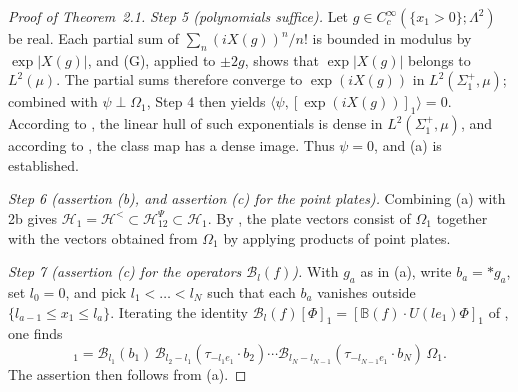 \documentclass[11pt,letterpaper,reqno]{amsart}
\theoremstyle{definition}
\begin{document}
\begin{proof}[Proof of Theorem~2.1]
\emph{Step 5 (polynomials suffice).}
Let $g\in C_c^\infty(\{x_1>0\};\Lambda^2)$ be real.
Each partial sum of $\sum_n(iX(g))^n/n!$ is bounded in modulus by $\exp|X(g)|$, and (G), applied to $\pm2g$, shows that $\exp|X(g)|$ belongs to $L^2(\mu)$.
The partial sums therefore converge to $\exp(iX(g))$ in $L^2(\Sigma_1^+,\mu)$; combined with $\psi\perp\Omega_1$, Step 4 then yields $\langle\psi,[\exp(iX(g))]_1\rangle=0$.
According to \cite[Lemma~8.12\,(i)]{QEDI}, the linear hull of such exponentials is dense in $L^2(\Sigma_1^+,\mu)$, and according to \cite[Proposition~8.19\,(i)]{QEDI}, the class map has a dense image.
Thus $\psi=0$, and (a) is established.

\emph{Step 6 (assertion (b), and assertion (c) for the point plates).}
Combining (a) with 2b gives $\mathcal H_1=\allowbreak \mathcal H^{<}\subset\mathcal H^{\Psi}_{12}\subset\mathcal H_1$.
By \cite[Definition~14.21]{QEDII}, the plate vectors consist of $\Omega_1$ together with the vectors obtained from $\Omega_1$ by applying products of point plates.

\emph{Step 7 (assertion (c) for the operators $\mathcal B_l(f)$).}
With $g_a$ as in (a), write $b_a=\ast g_a$, set $l_0=0$, and pick $l_1<\dots<l_N$ such that each $b_a$ vanishes outside $\{l_{a-1}\le x_1\le l_a\}$.
Iterating the identity $\mathcal B_l(f)[\Phi]_1=[\mathbb B(f)\cdot U(le_1)\Phi]_1$ of \cite[Proposition~14.16]{QEDII}, one finds
\begin{equation*}
[X(g_1)\cdots X(g_N)]_1=\mathcal B_{l_1}(b_1)\,\mathcal B_{l_2-l_1}(\tau_{-l_1e_1}\cdot b_2)\cdots\mathcal B_{l_N-l_{N-1}}(\tau_{-l_{N-1}e_1}\cdot b_N)\,\Omega_1.
\end{equation*}
The assertion then follows from (a).
\end{proof}
\end{document}
